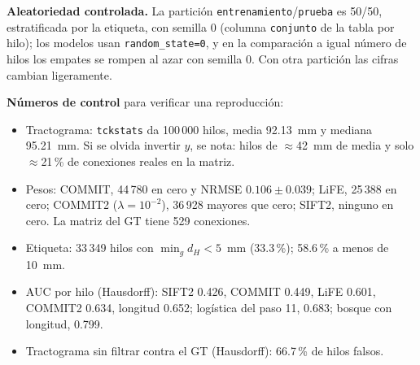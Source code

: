 \documentclass[11pt,a4paper]{article}
\newcommand{\code}[1]{\texttt{\small #1}}
\begin{document}
\textbf{Aleatoriedad controlada.} La partici\'on \code{entrenamiento}/\code{prueba} es 50/50,
estratificada por la etiqueta, con semilla 0 (columna \code{conjunto} de la tabla por hilo);
los modelos usan \code{random\_state=0}, y en la comparaci\'on a igual n\'umero de hilos los
empates se rompen al azar con semilla 0. Con otra partici\'on las cifras cambian ligeramente.

\textbf{N\'umeros de control} para verificar una reproducci\'on:
\begin{itemize}
  \item Tractograma: \code{tckstats} da 100\,000 hilos, media 92.13~mm y mediana 95.21~mm.
        Si se olvida invertir $y$, se nota: hilos de $\approx$42~mm de media y solo
        $\approx$21\,\% de conexiones reales en la matriz.
  \item Pesos: COMMIT, 44\,780 en cero y NRMSE $0.106\pm0.039$; LiFE, 25\,388 en cero;
        COMMIT2 ($\lambda=10^{-2}$), 36\,928 mayores que cero; SIFT2, ninguno en cero.
        La matriz del GT tiene 529 conexiones.
  \item Etiqueta: 33\,349 hilos con $\min_g d_H<5$~mm (33.3\,\%); 58.6\,\% a menos de 10~mm.
  \item AUC por hilo (Hausdorff): SIFT2 0.426, COMMIT 0.449, LiFE 0.601, COMMIT2 0.634,
        longitud 0.652; log\'istica del paso 11, 0.683; bosque con longitud, 0.799.
  \item Tractograma sin filtrar contra el GT (Hausdorff): 66.7\,\% de hilos falsos.
\end{itemize}
\end{document}
